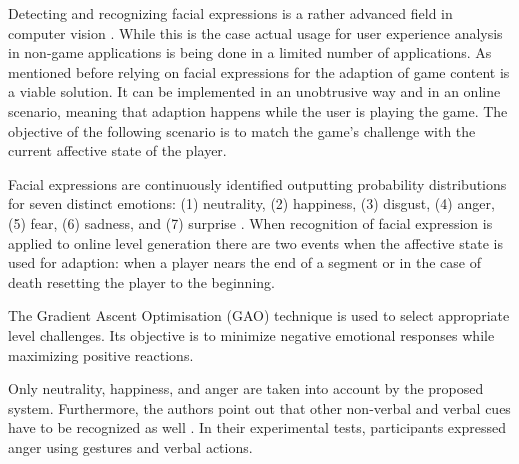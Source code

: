 Detecting and recognizing facial expressions is a rather advanced field in computer vision \cite{Blom2014}. 
While this is the case actual usage for user experience analysis in non-game applications is being done in a limited number of applications.
As mentioned before relying on facial expressions for the adaption of game content is a viable solution.
It can be implemented in an unobtrusive way and in an online scenario, meaning that adaption happens while the user is playing the game.
The objective of the following scenario is to match the game's challenge with the current affective state of the player.

Facial expressions are continuously identified outputting probability distributions for seven distinct emotions: (1) neutrality, (2) happiness, (3) disgust, (4) anger, (5) fear, (6) sadness, and (7) surprise \cite{Blom2014}.
When recognition of facial expression is applied to online level generation there are two events when the affective state is used for adaption: when a player nears the end of a segment or in the case of death resetting the player to the beginning.

The Gradient Ascent Optimisation (GAO) technique is used to select appropriate level challenges.
Its objective is to minimize negative emotional responses while maximizing positive reactions.

Only neutrality, happiness, and anger are taken into account by the proposed system.
Furthermore, the authors point out that other non-verbal and verbal cues have to be recognized as well \cite{Blom2014}.
In their experimental tests, participants expressed anger using gestures and verbal actions.